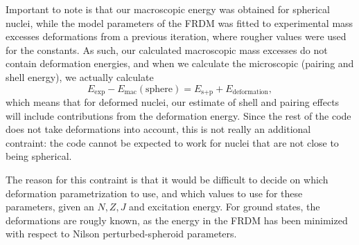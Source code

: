 Important to note is that our macroscopic energy was obtained for spherical nuclei, while the model parameters of the FRDM was fitted to experimental mass excesses deformations from a previous iteration, where rougher values were used for the constants. As such, our calculated macroscopic mass excesses do not contain deformation energies, and when we calculate the microscopic (pairing and shell energy), we actually calculate
\begin{equation}
E_\text{exp} - E_\text{mac}(\text{sphere}) = E_{\text{s}+\text{p}} + E_\text{deformation},
\end{equation}
which means that for deformed nuclei, our estimate of shell and pairing effects will include contributions from the deformation energy.
Since the rest of the code does not take deformations into account, this is not really an additional contraint: the code cannot be expected to work for nuclei that are not close to being spherical. 

The reason for this contraint is that it would be difficult to decide on which deformation parametrization to use, and which values to use for these parameters, given an $N,Z, J$ and excitation energy. For ground states, the deformations are rougly known, as the energy in the FRDM has been minimized with respect to Nilson perturbed-spheroid parameters. 